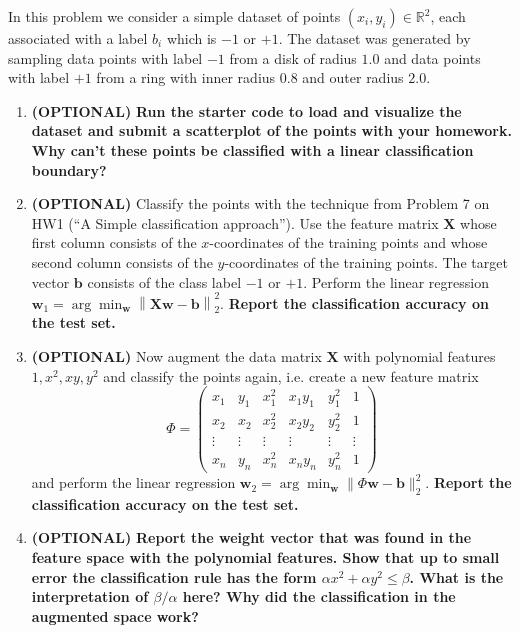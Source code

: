 \documentclass{article}\usepackage[utf8]{inputenc}\usepackage[margin=0.4cm,top=0.4cm,bottom=0.4cm]{geometry}\usepackage[usenames,dvipsnames,svgnames,table]{xcolor}
\newcommand{\norm}[1]{\left\lVert#1\right\rVert}
\begin{document}
\noindent In this problem we consider a simple dataset of points $(x_i, y_i) \in \mathbb{R}^2$, each associated with a label $b_i$ which is $-1$ or $+1$. The dataset was generated by sampling data points with label $-1$ from a disk of radius $1.0$ and data points with label $+1$ from a ring with inner radius $0.8$ and outer radius $2.0$.
\begin{enumerate}
\item \textbf{(OPTIONAL)} \textbf{Run the starter code to load and visualize the dataset and submit a scatterplot of the points with your homework. Why can't these points be classified with a linear classification boundary?}
\BeginSolution

\EndSolution
\item  \textbf{(OPTIONAL)} Classify the points with the technique from Problem 7 on HW1 (``A Simple classification approach''). Use the feature matrix $\mathbf{X}$ whose first column consists of the $x$-coordinates of the training points and whose second column consists of the $y$-coordinates of the training points. The target vector $\mathbf{b}$ consists of the class label $-1$ or $+1$. Perform the linear regression $\mathbf{w}_1 = \arg\min_{\mathbf{w}} \norm{\mathbf{X}\mathbf{w} - \mathbf{b}}_2^2$. \textbf{Report the classification accuracy on the test set.}
\BeginSolution

\EndSolution
\item \textbf{(OPTIONAL)} Now augment the data matrix $\mathbf{X}$ with polynomial features $1, x^2, xy, y^2$ and classify the points again, i.e. create a new feature matrix $$\Phi = \left(\begin{array}{cccccc}x_1 & y_1 & x_1^2 & x_1 y_1 & y_1^2 & 1\\ x_2 & x_2 & x_2^2 & x_2 y_2 & y_2^2 & 1\\ \vdots & \vdots & \vdots & \vdots & \vdots & \vdots \\ x_n & y_n & x_n^2 & x_n y_n & y_n^2 & 1\end{array}\right)$$ and perform the linear regression $\mathbf{w}_2 = \arg\min_{\mathbf{w}} \|{\Phi\mathbf{w} - \mathbf{b}}\|_2^2$. \textbf{Report the classification accuracy on the test set.}
\BeginSolution

\EndSolution
\item \textbf{(OPTIONAL)} \textbf{Report the weight vector that was found in the feature space with the polynomial features. Show that up to small error the classification rule has the form $\alpha x^2 + \alpha y^2 \leqslant \beta$. What is the interpretation of $\beta/\alpha$ here? Why did the classification in the augmented space work?}
\BeginSolution

\EndSolution
\end{enumerate}
\clearpage
\end{document}
